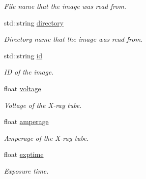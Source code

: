 \begin{DoxyCompactItemize}
\begin{DoxyCompactList}\small\item\em File name that the image was read from. \end{DoxyCompactList}\item 
std\+::string \hyperlink{classImage__cuda__compatible_a61b0501f13fd930381424ef192264d8c}{directory}\hypertarget{classImage__cuda__compatible_a61b0501f13fd930381424ef192264d8c}{}\label{classImage__cuda__compatible_a61b0501f13fd930381424ef192264d8c}

\begin{DoxyCompactList}\small\item\em Directory name that the image was read from. \end{DoxyCompactList}\item 
std\+::string \hyperlink{classImage__cuda__compatible_ad9b37cc5930be7da0fa1f67944d24c6d}{id}\hypertarget{classImage__cuda__compatible_ad9b37cc5930be7da0fa1f67944d24c6d}{}\label{classImage__cuda__compatible_ad9b37cc5930be7da0fa1f67944d24c6d}

\begin{DoxyCompactList}\small\item\em ID of the image. \end{DoxyCompactList}\item 
float \hyperlink{classImage__cuda__compatible_ad5eb722fdfbacb645668ea2132c5af63}{voltage}\hypertarget{classImage__cuda__compatible_ad5eb722fdfbacb645668ea2132c5af63}{}\label{classImage__cuda__compatible_ad5eb722fdfbacb645668ea2132c5af63}

\begin{DoxyCompactList}\small\item\em Voltage of the X-\/ray tube. \end{DoxyCompactList}\item 
float \hyperlink{classImage__cuda__compatible_a0d99144c0b338d311b5235385c40b63a}{amperage}\hypertarget{classImage__cuda__compatible_a0d99144c0b338d311b5235385c40b63a}{}\label{classImage__cuda__compatible_a0d99144c0b338d311b5235385c40b63a}

\begin{DoxyCompactList}\small\item\em Amperage of the X-\/ray tube. \end{DoxyCompactList}\item 
float \hyperlink{classImage__cuda__compatible_ab6d746eb607f4ce623c069458b2962a2}{exptime}\hypertarget{classImage__cuda__compatible_ab6d746eb607f4ce623c069458b2962a2}{}\label{classImage__cuda__compatible_ab6d746eb607f4ce623c069458b2962a2}

\begin{DoxyCompactList}\small\item\em Exposure time. \end{DoxyCompactList}\end{DoxyCompactItemize}
